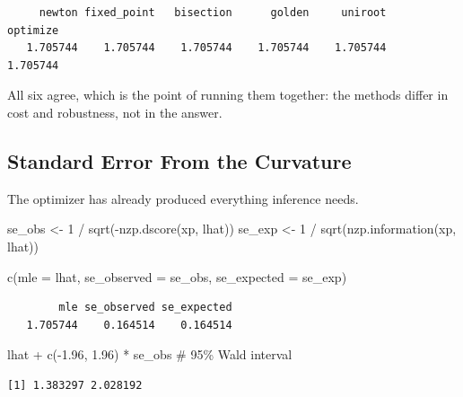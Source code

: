 \documentclass[
  letterpaper,
  DIV=11,
  numbers=noendperiod]{scrreprt}
\newenvironment{Shaded}{\begin{snugshade}}{\end{snugshade}}
\newcommand{\AttributeTok}[1]{\textcolor[rgb]{0.40,0.45,0.13}{#1}}
\newcommand{\CommentTok}[1]{\textcolor[rgb]{0.37,0.37,0.37}{#1}}
\newcommand{\DecValTok}[1]{\textcolor[rgb]{0.68,0.00,0.00}{#1}}
\newcommand{\FloatTok}[1]{\textcolor[rgb]{0.68,0.00,0.00}{#1}}
\newcommand{\FunctionTok}[1]{\textcolor[rgb]{0.28,0.35,0.67}{#1}}
\newcommand{\NormalTok}[1]{\textcolor[rgb]{0.00,0.23,0.31}{#1}}
\newcommand{\OtherTok}[1]{\textcolor[rgb]{0.00,0.23,0.31}{#1}}
\newcommand{\SpecialCharTok}[1]{\textcolor[rgb]{0.37,0.37,0.37}{#1}}
\begin{document}
\begin{verbatim}
     newton fixed_point   bisection      golden     uniroot    optimize 
   1.705744    1.705744    1.705744    1.705744    1.705744    1.705744 
\end{verbatim}

All six agree, which is the point of running them together: the methods
differ in cost and robustness, not in the answer.

\subsection{Standard Error From the
Curvature}\label{standard-error-from-the-curvature}

The optimizer has already produced everything inference needs.

\begin{Shaded}
\begin{Highlighting}[]
\NormalTok{se\_obs }\OtherTok{\textless{}{-}} \DecValTok{1} \SpecialCharTok{/} \FunctionTok{sqrt}\NormalTok{(}\SpecialCharTok{{-}}\FunctionTok{nzp.dscore}\NormalTok{(xp, lhat))}
\NormalTok{se\_exp }\OtherTok{\textless{}{-}} \DecValTok{1} \SpecialCharTok{/} \FunctionTok{sqrt}\NormalTok{(}\FunctionTok{nzp.information}\NormalTok{(xp, lhat))}

\FunctionTok{c}\NormalTok{(}\AttributeTok{mle =}\NormalTok{ lhat, }\AttributeTok{se\_observed =}\NormalTok{ se\_obs, }\AttributeTok{se\_expected =}\NormalTok{ se\_exp)}
\end{Highlighting}
\end{Shaded}

\begin{verbatim}
        mle se_observed se_expected 
   1.705744    0.164514    0.164514 
\end{verbatim}

\begin{Shaded}
\begin{Highlighting}[]
\NormalTok{lhat }\SpecialCharTok{+} \FunctionTok{c}\NormalTok{(}\SpecialCharTok{{-}}\FloatTok{1.96}\NormalTok{, }\FloatTok{1.96}\NormalTok{) }\SpecialCharTok{*}\NormalTok{ se\_obs                     }\CommentTok{\# 95\% Wald interval}
\end{Highlighting}
\end{Shaded}

\begin{verbatim}
[1] 1.383297 2.028192
\end{verbatim}
\end{document}
